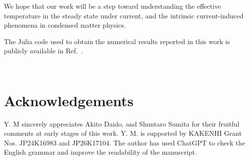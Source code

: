 \documentclass[a4paper, amsfonts, amssymb, amsmath, reprint, showkeys, nofootinbib, twoside,superscriptaddress, prb]{revtex4-2}
\begin{document}
We hope that our work will be a step toward understanding the effective temperature in the steady state under current, and the intrinsic current-induced phenomena in condensed matter physics.

The Julia code used to obtain the numerical results reported in this work is publicly available in Ref.~\cite{Data}.

\

\section*{Acknowledgements}
Y. M sincerely appreciates Akito Daido, and Shuntaro Sumita for their fruitful comments at early stages of this work. Y. M. is supported by KAKENHI Grant Nos. JP24K16983 and JP26K17104. 
The author has used ChatGPT to check the English grammar and improve the readability of the manuscript.



%
\end{document}
